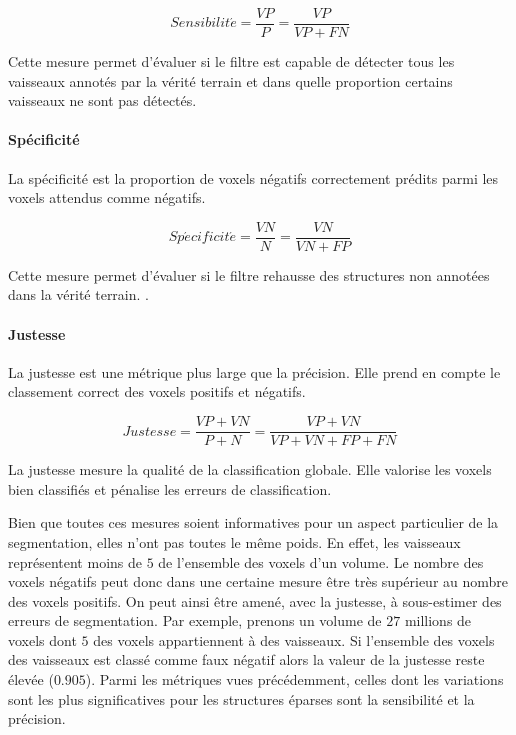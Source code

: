 \begin{equation}
  Sensibilit\acute{e} = \frac{VP}{P} = \frac{VP}{VP+FN}
\end{equation}

Cette mesure permet d'évaluer si le filtre est capable de détecter tous les vaisseaux annotés par la vérité terrain et dans quelle proportion certains vaisseaux ne sont pas détectés. 

\paragraph{Spécificité}

La spécificité est la proportion de voxels négatifs correctement prédits parmi les voxels attendus comme négatifs.

\begin{equation}
  Sp\acute{e}cificit\acute{e} = \frac{VN}{N} = \frac{VN}{VN+FP}
\end{equation}

Cette mesure permet d'évaluer si le filtre rehausse des structures non annotées dans la vérité terrain. .

\paragraph{Justesse}

La justesse est une métrique plus large que la précision. Elle prend en compte le classement correct des voxels positifs et négatifs. 

\begin{equation}
  Justesse = \frac{VP+VN}{P+N} = \frac{VP+VN}{VP+VN+FP+FN}
\end{equation}

La justesse mesure la qualité de la classification globale. Elle valorise les voxels bien classifiés et pénalise les erreurs de classification.

Bien que toutes ces mesures soient informatives pour un aspect particulier de la segmentation, elles n'ont pas toutes le même poids. En effet, les vaisseaux représentent moins de $5$ \percent{}de l'ensemble des voxels d'un volume. Le nombre des voxels négatifs peut donc dans une certaine mesure être très supérieur au nombre des voxels positifs. On peut ainsi être amené, avec la justesse, à sous-estimer des erreurs de segmentation. Par exemple, prenons un  volume de $27$ millions de voxels dont $5$ \percent{} des voxels appartiennent à des vaisseaux. Si l'ensemble des voxels des vaisseaux est classé comme faux négatif alors la valeur de la justesse reste élevée ($0.905$). Parmi les métriques vues précédemment, celles dont les variations sont les plus significatives pour les structures éparses sont la sensibilité et la précision. 

